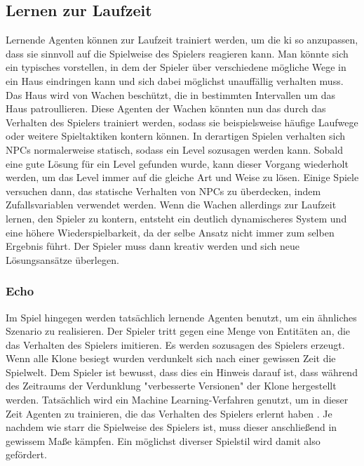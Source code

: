 \subsection{Lernen zur Laufzeit}
Lernende Agenten können zur Laufzeit trainiert werden, um die \ac{ki} so anzupassen, dass sie sinnvoll auf die Spielweise des Spielers reagieren kann.
Man könnte sich ein typisches  vorstellen, in dem der Spieler über verschiedene mögliche Wege in ein Haus eindringen kann und sich dabei möglichst unauffällig verhalten muss. Das Haus wird von Wachen beschützt, die in bestimmten Intervallen um das Haus patroullieren. Diese Agenten der Wachen könnten nun das durch das Verhalten des Spielers trainiert werden, sodass sie beispielsweise häufige Laufwege oder weitere Spieltaktiken kontern können.
In derartigen Spielen verhalten sich NPCs normalerweise statisch, sodass ein Level sozusagen  werden kann. Sobald eine gute Lösung für ein Level gefunden wurde, kann dieser Vorgang wiederholt werden, um das Level immer auf die gleiche Art und Weise zu lösen. Einige Spiele versuchen dann, das statische Verhalten von NPCs zu überdecken, indem Zufallsvariablen verwendet werden. Wenn die Wachen allerdings zur Laufzeit lernen, den Spieler zu kontern, entsteht ein deutlich dynamischeres System und eine höhere Wiederspielbarkeit, da der selbe Ansatz nicht immer zum selben Ergebnis führt. Der Spieler muss dann kreativ werden und sich neue Lösungsansätze überlegen.



\subsubsection{Echo}
Im Spiel  \cite{echo} hingegen werden tatsächlich lernende Agenten benutzt, um ein ähnliches Szenario zu realisieren. Der Spieler tritt gegen eine Menge von Entitäten an, die das Verhalten des Spielers imitieren. Es werden sozusagen  des Spielers erzeugt. Wenn alle Klone besiegt wurden verdunkelt sich nach einer gewissen Zeit die Spielwelt. Dem Spieler ist bewusst, dass dies ein Hinweis darauf ist, dass während des Zeitraums der Verdunklung "verbesserte Versionen" der Klone hergestellt werden. Tatsächlich wird ein Machine Learning-Verfahren genutzt, um in dieser Zeit Agenten zu trainieren, die das Verhalten des Spielers erlernt haben \cite{echo_interview}. Je nachdem wie starr die Spielweise des Spielers ist, muss dieser anschließend in gewissem Maße  kämpfen. Ein möglichst diverser Spielstil wird damit also gefördert.

